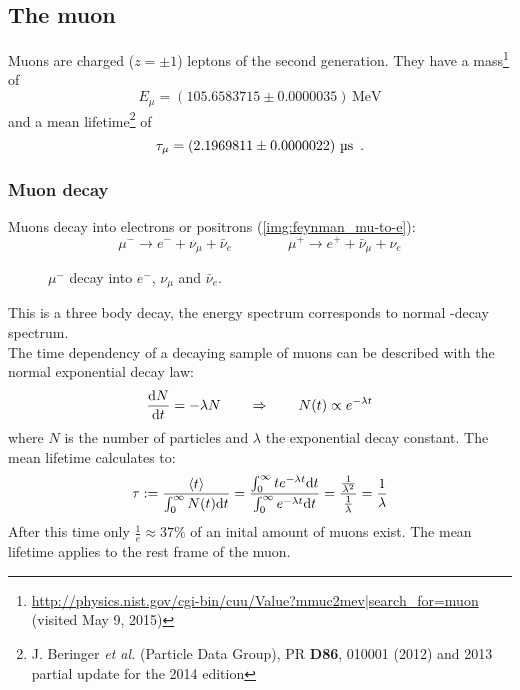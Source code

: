 \subsection{The muon}
Muons are charged ($z=\pm1$) leptons of the second generation. They have a mass\footnote{\url{http://physics.nist.gov/cgi-bin/cuu/Value?mmuc2mev|search_for=muon} (visited May 9, 2015)} of 
\begin{equation}
	\label{eq:litval:mass}
    E_\mu = (105.6583715 \pm 0.0000035)\,\text{MeV}
\end{equation}
and a mean lifetime\footnote{J. Beringer \emph{et al.} (Particle Data Group), PR \textbf{D86}, 010001 (2012) and 2013 partial update for the 2014 edition} of 
\begin{equation}
	\label{eq:litval:meanlifetime}
    \tau_\mu = \left( 2.1969811 \pm 0.0000022 \right)\,\text{\textmu s}\ \, .
\end{equation}
\subsubsection{Muon decay}
\label{sub:decay}
Muons decay into electrons or positrons (\autoref{img:feynman_mu-to-e}):
\begin{equation}
	\mu^- \rightarrow e^- + \nu_\mu + \bar{\nu}_e \qquad \qquad \mu^+ \rightarrow e^+ + \bar{\nu}_\mu + \nu_e
\end{equation}
\begin{figure}[htb]
        \centering
        \def\svgwidth{0.35\textwidth}
       
        \caption{$\mu^-$ decay into $e^-$, $\nu_\mu$ and $\bar{\nu}_e$.}
        \label{img:feynman_mu-to-e}
\end{figure}
This is a three body decay, the energy spectrum corresponds to normal \textbeta-decay spectrum. \\
The time dependency of a decaying sample of muons can be described with the normal exponential decay law:
\begin{equation}
	\label{eq:expdecay}
	\frac{\mathrm{d} N}{\mathrm{d} t} = - \lambda N \qquad \Rightarrow \qquad N(t) \propto e^{-\lambda t}
\end{equation}
where $N$ is the number of particles and $\lambda$ the exponential decay constant. The mean lifetime calculates to:
\begin{equation}
    \tau := \frac{\left<t\right>}{\int_0^\infty N(t) \mathrm{d} t} = 
    \frac{\int_0^\infty t e^{-\lambda t} \mathrm{d} t}{\int_0^\infty e^{-\lambda t} \mathrm{d} t} = 
    \frac{\frac{1}{\lambda^2}}{\frac{1}{\lambda}} = \frac{1}{\lambda}
\end{equation}
After this time only $\frac{1}{e} \approx 37\%$ of an inital amount of muons exist. The mean lifetime applies to the rest frame of the muon.
